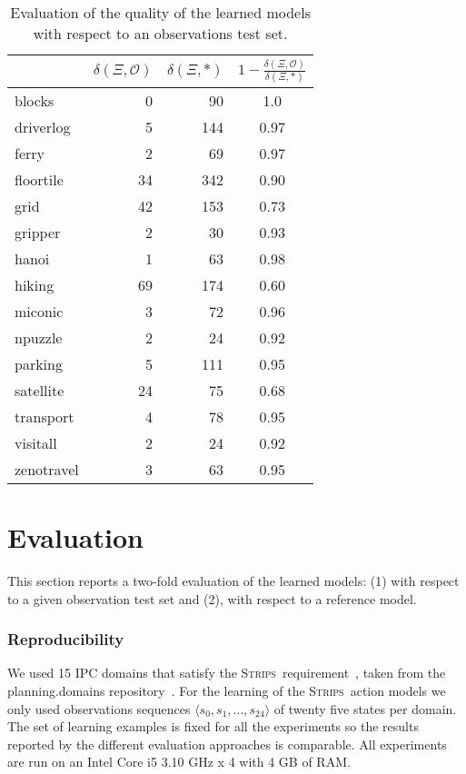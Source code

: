 \documentclass{article}
\newcommand{\tup}[1]{{\langle #1 \rangle}}
\newcommand{\strips}{\textsc{Strips}}     %
\begin{document}
\begin{table}
		\begin{center}
                \begin{footnotesize}
			\begin{tabular}{l|r|r|c|}
				& $\delta(\Xi,\mathcal{O})$ & $\delta(\Xi,*)$ & $1-\frac{\delta(\Xi,\mathcal{O})}{\delta(\Xi,*)}$ \\
				\hline
				blocks & 0 & 90 & 1.0 \\
				driverlog & 5 & 144 & 0.97 \\
				ferry & 2 & 69 & 0.97 \\
				floortile & 34 & 342 & 0.90 \\
				grid & 42 & 153 & 0.73 \\
				gripper & 2 & 30 & 0.93 \\
				hanoi & 1 & 63 & 0.98 \\
				hiking & 69 & 174 & 0.60 \\
				miconic & 3 & 72 & 0.96 \\
				npuzzle & 2 & 24 & 0.92 \\
				parking & 5 & 111 & 0.95 \\
				satellite & 24 & 75 & 0.68 \\
				transport & 4 & 78 & 0.95 \\
				visitall & 2 & 24 & 0.92 \\
				zenotravel & 3 & 63 & 0.95
			\end{tabular}
                        	\end{footnotesize}
		\end{center}
	\caption{\small Evaluation of the quality of the learned models with respect to an observations test set.}
	\label{fig:observationstest}                
\end{table}

\section{Evaluation}
This section reports a two-fold evaluation of the learned models: (1) with respect to a given observation test set and (2), with respect to a reference model. 

\subsubsection{Reproducibility}
We used 15 IPC domains that satisfy the \strips\ requirement~\cite{fox2003pddl2}, taken from the {\sc planning.domains} repository~\cite{muise2016planning}. For the learning of the \strips\ action models we only used observations sequences $\tup{s_0, s_1, \ldots, s_{24}}$ of twenty five states per domain. The set of learning examples is fixed for all the experiments so the results reported by the different evaluation approaches is comparable. All experiments are run on an Intel Core i5 3.10 GHz x 4 with 4 GB of RAM.
\end{document}
